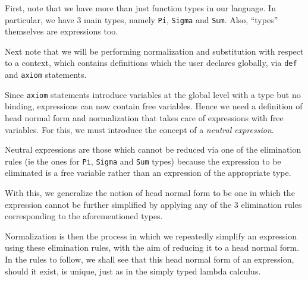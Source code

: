 \documentclass{article}
\begin{document}
First, note that we have more than just function types in our language. In
particular, we have 3 main types, namely \verb|Pi|, \verb|Sigma| and \verb|Sum|.
Also, ``types'' themselves are expressions too.

Next note that we will be performing normalization and substitution with
respect to a context, which contains definitions which the user declares
globally, via \verb|def| and \verb|axiom| statements.

Since \verb|axiom| statements introduce variables at the global level with a
type but no binding, expressions can now contain free variables.
Hence we need a definition of head normal form and normalization
that takes care of expressions with free variables.
For this, we must introduce the concept of a \textit{neutral expression}.

Neutral expressions are those which cannot be reduced via one of the elimination
rules (ie the ones for \verb|Pi|, \verb|Sigma| and \verb|Sum| types) because 
the expression to be eliminated is a free variable rather than an expression of
the appropriate type.

With this, we generalize the notion of head normal form to be one in which
the expression cannot be further simplified by applying any of the 3
elimination rules corresponding to the aforementioned types.

Normalization is then the process in which we repeatedly simplify an expression
using these elimination rules, with the aim of reducing it to a head normal form.
In the rules to follow, we shall see that this head normal form of an expression,
should it exist, is unique, just as in the simply typed lambda calculus.
\end{document}
